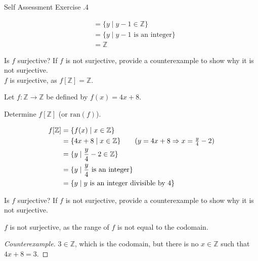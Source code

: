 \documentclass[\main/notes.tex]{subfiles}
\begin{document}
\begin{exercise}{Self Assessment Exercise \thechapter.4}
\begin{questions}
\begin{questions}
\begin{answer}
\begin{align*}
										&= \{y \mid y - 1 \in \mathbb{Z}\}\\
										&= \{y \mid y - 1 \text{ is an integer}\}\\
										&= \mathbb{Z}
									\end{align*}
								\end{answer}
							\item Is $f$ surjective? If $f$ is not surjective, provide a counterexample to show why it is not surjective.\\
								{\answer $f$ is surjective, as $f[\mathbb{Z}] = \mathbb{Z}$.}
						\end{questions}
					\item Let $f: \mathbb{Z} \rightarrow \mathbb{Z}$ be defined by $f(x) = 4x + 8$.
						\begin{questions}
							\item Determine $f[\mathbb{Z}]$ (or $\mathrm{ran}(f)$).
								\begin{answer}
									\begin{align*}
										f[\mathbb{Z}] &= \{f(x) \mid x \in \mathbb{Z}\}\\
										&= \{4x + 8 \mid x \in \mathbb{Z}\} \tag*{$(y = 4x + 8 \Rightarrow x = \frac{y}{4} - 2)$}\\
										&= \{y \mid \frac{y}{4} - 2 \in \mathbb{Z}\}\\
										&= \{y \mid \frac{y}{4} \text{ is an integer}\}\\
										&= \{y \mid y \text{ is an integer divisible by 4}\}
									\end{align*}
								\end{answer}
								\item Is $f$ surjective? If $f$ is not surjective, provide a counterexample to show why it is not surjective.\\
									\begin{answer}
										$f$ is not surjective, as the range of $f$ is not equal to the codomain.
										\begin{proof}[Counterexample]
											$3 \in \mathbb{Z}$, which is the codomain, but there is no $x \in \mathbb{Z}$ such that $4x + 8 = 3$.
										\end{proof}
									\end{answer}
						\end{questions}
				\end{questions}
			\end{exercise}
		\pagebreak
\end{document}
